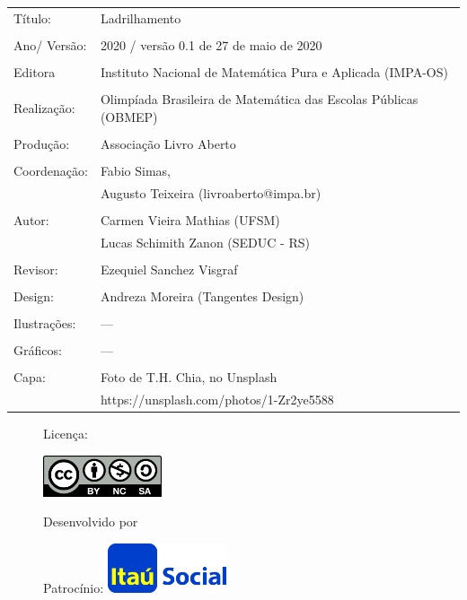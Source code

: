 \begin{tabular}{p{}p{}}
Título: & Ladrilhamento\\
\\
Ano/ Versão: & 2020 / versão 0.1 de 27 de maio de 2020\\
\\
Editora & Instituto Nacional de Matem\'atica Pura e Aplicada (IMPA-OS)\\
\\
Realização:& Olimp\'iada Brasileira de Matem\'atica das Escolas P\'ublicas (OBMEP)\\
\\
Produção:& Associação Livro Aberto\\
\\
Coordenação: & Fabio Simas, \\
			&  Augusto Teixeira (livroaberto@impa.br)\\
\\
  Autor: & Carmen Vieira Mathias (UFSM) \\
         & Lucas Schimith Zanon (SEDUC - RS) \\
\\
Revisor: & Ezequiel Sanchez Visgraf  \\
\\
Design: & Andreza Moreira (Tangentes Design) \\
\\
  Ilustrações: & --- \\ 
\\
Gráficos: & --- \\
\\
  Capa: & Foto de T.H. Chia, no Unsplash \\
  		& https://unsplash.com/photos/1-Zr2ye5588 \\

\end{tabular}


\begin{figure}[b]
\begin{minipage}[l]{5cm}
\centering

{\large Licença:}

  \includegraphics[width=3.5cm]{Figuras/cc-by-nc-sa}
\end{minipage}\hfill
\begin{minipage}[c]{5cm}
\centering
{\large Desenvolvido por}



{\large Patrocínio:}
  \vspace{1em}
  \includegraphics[width=3.5cm]{itau}
\end{minipage}
\end{figure}


